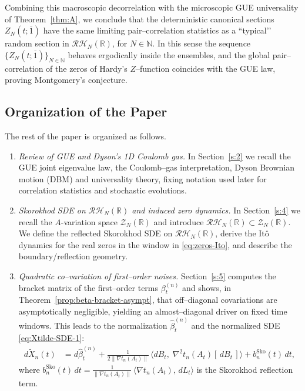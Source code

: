 \documentclass[12pt,reqno]{amsart}
\theoremstyle{plain}
\theoremstyle{definition}
\theoremstyle{remark}
\begin{document}
Combining this macroscopic decorrelation with the microscopic GUE universality of
Theorem~\ref{thm:A},
we conclude that the deterministic canonical sections \(Z_N(t;\overline{1})\) have the same
limiting pair–correlation statistics as a “typical’’ random section in \(\mathcal{RH}_N(\mathbb{R})\), for $N \in \mathbb{N}$.
In this sense the sequence \(\{Z_N(t;\overline{1})\}_{N\in\mathbb{N}}\) behaves ergodically inside the
ensembles, and the global pair–correlation of the zeros of Hardy’s \(Z\)–function coincides
with the GUE law, proving Montgomery’s conjecture.


\subsection{Organization of the Paper} The rest of the paper is organized as follows.
\begin{enumerate}
  \item \emph{Review of GUE and Dyson’s 1D Coulomb gas.} In Section~\ref{s:2} we recall the GUE joint eigenvalue law, the Coulomb–gas interpretation, Dyson Brownian motion (DBM) and universality theory, fixing notation used later for correlation statistics and stochastic evolutions.

  \item \emph{Skorokhod SDE on $\mathcal{RH}_N(\mathbb{R})$ and induced zero dynamics.} In Section~\ref{s:4} we recall the $A$-variation space $\mathcal{Z}_N(\mathbb{R})$ and introduce $\mathcal{RH}_N(\mathbb{R}) \subset \mathcal{Z}_N(\mathbb{R})$. We define the reflected Skorokhod SDE on $\mathcal{RH}_N(\mathbb{R})$, derive the Itô dynamics for the real zeros in the window in \eqref{eq:zeros-Ito}, and describe the boundary/reflection geometry.

  \item \emph{Quadratic co–variation of first–order noises.} Section~\ref{s:5} computes the bracket matrix of the first–order terms $\beta^{(n)}_t$ and shows, in Theorem~\ref{prop:beta-bracket-asympt}, that off–diagonal covariations are asymptotically negligible, yielding an almost–diagonal driver on fixed time windows. This leads to the normalization $\hat{\beta}^{(n)}_t$ and the normalized SDE \eqref{eq:Xtilde-SDE-1}:
  \begin{equation}
  \label{eq:Xtilde-SDE-2}
  \begin{aligned}
  d\widetilde X_n(t)
  &= d\hat\beta^{(n)}_t
     + \frac{1}{2\big\|\nabla t_n(A_t)\big\|}\,
       \big\langle dB_t,\; \nabla^2 t_n(A_t)[\,dB_t\,]\big\rangle
     + b^{\mathrm{Sko}}_n(t)\,dt,
  \end{aligned}
  \end{equation}
  where $b^{\mathrm{Sko}}_n(t)\,dt=\frac{1}{\|\nabla t_n(A_t)\|}\,\langle \nabla t_n(A_t),\,dL_t\rangle$ is the Skorokhod reflection term.


\end{enumerate}
\end{document}
